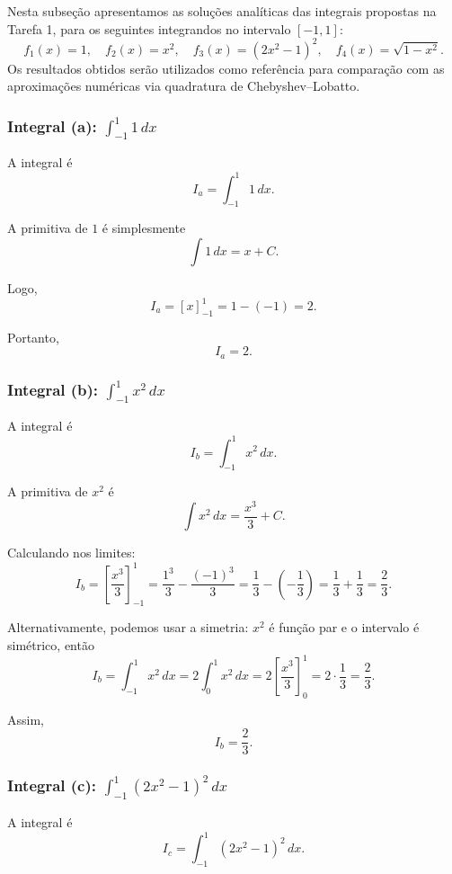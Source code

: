 \documentclass[12pt,a4paper]{article}
\begin{document}
Nesta subseção apresentamos as soluções analíticas das integrais propostas na Tarefa 1,
para os seguintes integrandos no intervalo $[-1,1]$:
\[
f_1(x) = 1,\quad
f_2(x) = x^2,\quad
f_3(x) = (2x^2 - 1)^2,\quad
f_4(x) = \sqrt{1 - x^2}.
\]
Os resultados obtidos serão utilizados como referência para comparação com as aproximações
numéricas via quadratura de Chebyshev--Lobatto.

\subsubsection{Integral (a): \texorpdfstring{$\displaystyle \int_{-1}^{1} 1 \, dx$}{∫\_{-1}^1 1 dx}}

A integral é
\[
I_a = \int_{-1}^{1} 1 \, dx.
\]

A primitiva de $1$ é simplesmente
\[
\int 1 \, dx = x + C.
\]

Logo,
\[
I_a = \left[ x \right]_{-1}^{1} = 1 - (-1) = 2.
\]

Portanto,
\[
\boxed{I_a = 2}.
\]

\subsubsection{Integral (b): \texorpdfstring{$\displaystyle \int_{-1}^{1} x^2 \, dx$}{∫\_{-1}^1 x² dx}}

A integral é
\[
I_b = \int_{-1}^{1} x^2 \, dx.
\]

A primitiva de $x^2$ é
\[
\int x^2 \, dx = \frac{x^3}{3} + C.
\]

Calculando nos limites:
\[
I_b = \left[ \frac{x^3}{3} \right]_{-1}^{1}
    = \frac{1^3}{3} - \frac{(-1)^3}{3}
    = \frac{1}{3} - \left(-\frac{1}{3}\right)
    = \frac{1}{3} + \frac{1}{3}
    = \frac{2}{3}.
\]

Alternativamente, podemos usar a simetria: $x^2$ é função par e o intervalo é simétrico, então
\[
I_b = \int_{-1}^{1} x^2 \, dx
    = 2 \int_{0}^{1} x^2 \, dx
    = 2 \left[ \frac{x^3}{3} \right]_{0}^{1}
    = 2 \cdot \frac{1}{3}
    = \frac{2}{3}.
\]

Assim,
\[
\boxed{I_b = \dfrac{2}{3}}.
\]

\subsubsection{Integral (c): \texorpdfstring{$\displaystyle \int_{-1}^{1} (2x^2 - 1)^2 \, dx$}{∫\_{-1}^1 (2x²−1)² dx}}

A integral é
\[
I_c = \int_{-1}^{1} (2x^2 - 1)^2 \, dx.
\]
\end{document}
